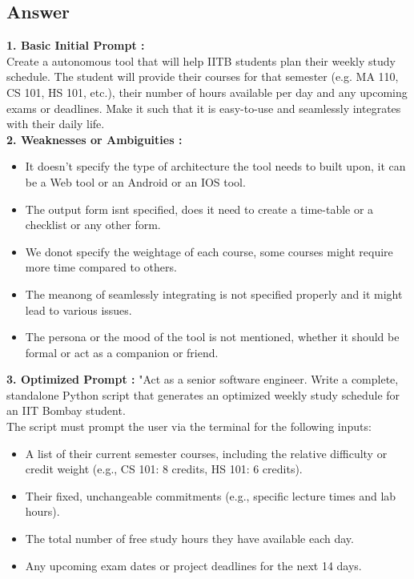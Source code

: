 \documentclass{article}
\begin{document}
\subsection{Answer}
\textbf{1. Basic Initial Prompt :}\\
\hspace*{15pt}Create a autonomous tool that will help IITB students plan their weekly study schedule. The student will provide their courses for that semester (e.g. MA 110, CS 101, HS 101, etc.), their number of hours available per day and any upcoming exams or deadlines. Make it such that it is easy-to-use and seamlessly integrates with their daily life.\\
\textbf{2. Weaknesses or Ambiguities :}
\begin{itemize}
\item\hspace*{15pt} It doesn't specify the type of architecture the tool needs to built upon, it can be a Web tool or an Android or an IOS tool.
\item\hspace*{15pt} The output form isnt specified, does it need to create a time-table or a checklist or any other form.
\item\hspace*{15pt} We donot specify the weightage of each course, some courses might require more time compared to others.
\item\hspace*{15pt} The meanong of seamlessly integrating is not specified properly and it might lead to various issues.
\item\hspace*{15pt} The persona or the mood of the tool is not mentioned, whether it should be formal or act as a companion or friend.
\end{itemize}
\textbf{3. Optimized Prompt :}
"Act as a senior software engineer. Write a complete, standalone Python script that generates an optimized weekly study schedule for an IIT Bombay student.\\
The script must prompt the user via the terminal for the following inputs:
\begin{itemize}
\item\hspace*{15pt} A list of their current semester courses, including the relative difficulty or credit weight (e.g., CS 101: 8 credits, HS 101: 6 credits).
\item\hspace*{15pt} Their fixed, unchangeable commitments (e.g., specific lecture times and lab hours).
\item\hspace*{15pt} The total number of free study hours they have available each day.
\item\hspace*{15pt} Any upcoming exam dates or project deadlines for the next 14 days.
\end{itemize}
\end{document}
